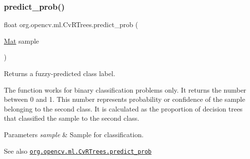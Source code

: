 \subsubsection{\texorpdfstring{predict\+\_\+prob()}{predict\_prob()}\hspace{0.1cm}{\footnotesize\ttfamily [2/2]}}
{\footnotesize\ttfamily float org.\+opencv.\+ml.\+Cv\+R\+Trees.\+predict\+\_\+prob (\begin{DoxyParamCaption}\item[{\mbox{\hyperlink{classorg_1_1opencv_1_1core_1_1_mat}{Mat}}}]{sample }\end{DoxyParamCaption})}

Returns a fuzzy-\/predicted class label.

The function works for binary classification problems only. It returns the number between 0 and 1. This number represents probability or confidence of the sample belonging to the second class. It is calculated as the proportion of decision trees that classified the sample to the second class.


\begin{DoxyParams}{Parameters}
{\em sample} & Sample for classification.\\
\hline
\end{DoxyParams}
\begin{DoxySeeAlso}{See also}
\href{http://docs.opencv.org/modules/ml/doc/random_trees.html#cvrtrees-predict-prob}{\tt org.\+opencv.\+ml.\+Cv\+R\+Trees.\+predict\+\_\+prob} 
\end{DoxySeeAlso}
\mbox{\label{classorg_1_1opencv_1_1ml_1_1_cv_r_trees_a016b976743279598c4ce0ffb9b52b7f1}} 
